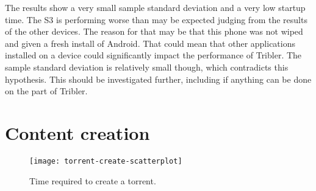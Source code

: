 The results show a very small sample standard deviation and a very low startup time.
The S3 is performing worse than may be expected judging from the results of the other devices.
The reason for that may be that this phone was not wiped and given a fresh install of Android.
That could mean that other applications installed on a device could significantly impact the performance of Tribler.
The sample standard deviation is relatively small though, which contradicts this hypothesis.
This should be investigated further, including if anything can be done on the part of Tribler.


\section{Content creation}
\begin{figure}[H]
	\centering %
	\texttt{[image: torrent-create-scatterplot]}
	\caption{Time required to create a torrent.}
	\label{fig:torrent-create-scatterplot}
\end{figure}


